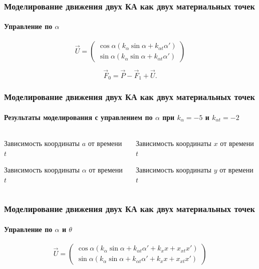 \documentclass[10pt,pdf,hyperref={unicode}]{beamer}
\begin{document}
\begin{frame}
\frametitle{Моделирование движения двух КА как двух материальных точек}
\framesubtitle{Управление по $\alpha$}
		\begin{equation*}
			\vec{U} = 
			\begin{pmatrix}
				\cos \alpha \left(k_\alpha \sin \alpha + k_{\alpha t}\alpha'\right)\\
				\sin \alpha \left(k_\alpha \sin \alpha + k_{\alpha t}\alpha'\right)
			\end{pmatrix}
		\end{equation*}
		
		\begin{equation*}
			\vec{F}_0 = \vec{P} - \vec{F}_1 + \vec{U}.
		\end{equation*}
\end{frame}

\begin{frame}
\frametitle{Моделирование движения двух КА как двух материальных точек}
\framesubtitle{Результаты моделирования с управлением по $\alpha$ при $k_\alpha = -5$ и $k_{\alpha t} = -2$}
\begin{columns}[onlytextwidth]
	\begin{column}{0.5\textwidth}
		\begin{figure}[H]
		\end{figure}
		\scriptsize{Зависимость координаты $a$ от времени $t$}
		\begin{figure}[H]
		\end{figure} 
		\scriptsize{Зависимость координаты $\alpha$ от времени $t$}
	\end{column}
	\begin{column}{0.5\textwidth}
		\begin{figure}[H]
		\end{figure} 
		\scriptsize{Зависимость координаты $x$ от времени $t$}
		\begin{figure}[H]
		\end{figure} 
		\scriptsize{Зависимость координаты $y$ от времени $t$}
	\end{column}
\end{columns}
\end{frame}

\begin{frame}
\frametitle{Моделирование движения двух КА как двух материальных точек}
\framesubtitle{Управление по $\alpha$ и $\theta$}
		\begin{equation*}
			\vec{U} = 
			\begin{pmatrix}
				\cos \alpha \left(k_\alpha \sin \alpha + k_{\alpha t}\alpha' + k_x x + x_{xt} x'\right)\\
				\sin \alpha \left(k_\alpha \sin \alpha + k_{\alpha t}\alpha' + k_x x + x_{xt} x'\right)
			\end{pmatrix}
		\end{equation*}
\end{frame}
\end{document}

